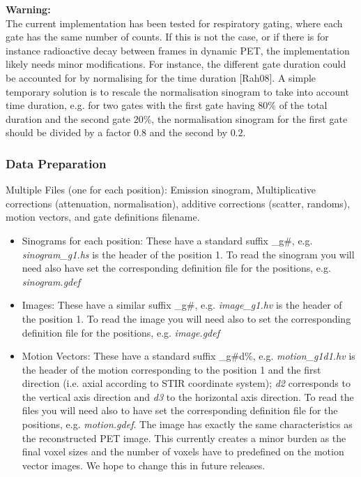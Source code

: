 \documentclass{article}
\begin{document}
\noindent \textbf{Warning:}\\
The current implementation has been tested for respiratory gating, where each gate has the same number of
counts. If this is not the case, or if there is for instance radioactive decay between frames in dynamic
PET, the implementation likely needs minor modifications. For instance, the different gate duration could
be accounted for by normalising for the time duration [Rah08].
A simple temporary solution is to rescale the
normalisation sinogram to take into account time duration, e.g. for two
gates with the first gate having $80$\% of the total duration and the second
gate $20$\%, the normalisation sinogram for the first gate should be divided
by a factor $0.8$ and the second by $0.2$.



\subsubsection{Data Preparation}

Multiple
Files (one for each position): Emission sinogram, Multiplicative corrections
(attenuation, normalisation), additive corrections (scatter, randoms), motion
vectors, and gate definitions filename.

\begin{itemize}
\item Sinograms for each position: 
These have a standard suffix \_g\#, e.g. \textit{sinogram\_g1.hs} is the header of the
position 1. To read the sinogram you will need also have set the corresponding
definition file for the positions, e.g. \textit{sinogram.gdef}

\item Images:
These have a similar suffix \_g\#, e.g. \textit{image\_g1.hv} is the header of the
position 1. To read the image you will need also to set the corresponding
definition file for the positions, e.g. \textit{image.gdef}

\item Motion Vectors:
These have a standard suffix \_g\#d\%, e.g. \textit{motion\_g1d1.hv} is the header of the motion
corresponding to the position 1 and the first direction (i.e. axial according
to STIR coordinate system); \textit{d2} corresponds to the vertical axis
direction and \textit{d3} to the horizontal axis direction. To read the files you
will need also to have set the corresponding definition file for the positions,
e.g. \textit{motion.gdef}. The image has exactly the same characteristics as the
reconstructed PET image. This currently creates a minor burden as the final
voxel sizes and the number of voxels have to predefined on the motion vector
images. We hope to change this in future releases. 
\end{itemize}
\end{document}
